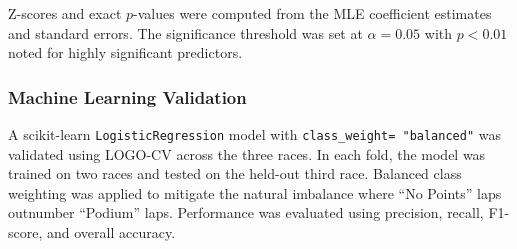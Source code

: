Z-scores and exact $p$-values were computed from the MLE coefficient estimates
and standard errors. The significance threshold was set at $\alpha = 0.05$
with $p < 0.01$ noted for highly significant predictors.

\subsubsection{Machine Learning Validation}

A scikit-learn \texttt{LogisticRegression} model with \texttt{class\_weight=
"balanced"} was validated using LOGO-CV across the three races. In each fold,
the model was trained on two races and tested on the held-out third race.
Balanced class weighting was applied to mitigate the natural imbalance where
``No Points'' laps outnumber ``Podium'' laps. Performance was evaluated using
precision, recall, F1-score, and overall accuracy.
